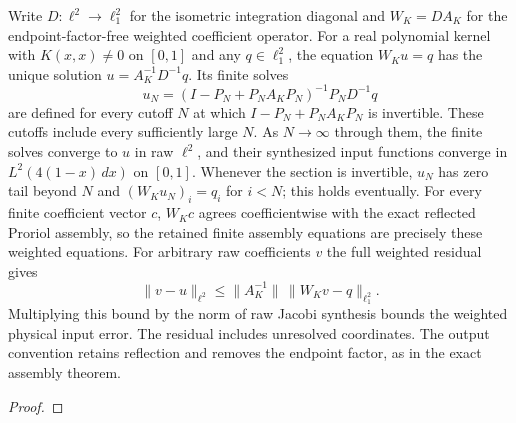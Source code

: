 \begin{theorem}
\label{thm:volterra-weighted-solves}
\leanok
Write $D:\ell^2\to\ell^2_1$ for the isometric integration diagonal and
$W_K=DA_K$ for the endpoint-factor-free weighted coefficient operator.
For a real polynomial kernel with $K(x,x)\ne0$ on $[0,1]$ and any
$q\in\ell^2_1$, the equation $W_Ku=q$ has the unique solution
$u=A_K^{-1}D^{-1}q$. Its finite solves
\[
 u_N=(I-P_N+P_NA_KP_N)^{-1}P_ND^{-1}q
\]
are defined for every cutoff $N$ at which $I-P_N+P_NA_KP_N$ is invertible. These cutoffs include every sufficiently large $N$. As $N\to\infty$ through them, the finite solves converge to $u$ in raw $\ell^2$, and their synthesized input functions converge
in $L^2(4(1-x)\,dx)$ on $[0,1]$.
Whenever the section is invertible, $u_N$ has zero tail beyond $N$ and
$(W_Ku_N)_i=q_i$ for $i<N$; this holds eventually.
For every finite coefficient vector $c$, $W_Kc$ agrees coefficientwise
with the exact reflected Proriol assembly, so the retained finite assembly
equations are precisely these weighted equations.
For arbitrary raw coefficients $v$ the full weighted residual gives
\[
 \|v-u\|_{\ell^2}\le
 \|A_K^{-1}\|\,\|W_Kv-q\|_{\ell^2_1}.
\]
Multiplying this bound by the norm of raw Jacobi synthesis bounds the
weighted physical input error. The residual includes unresolved coordinates.
The output convention retains reflection and removes the endpoint factor,
as in the exact assembly theorem.
\end{theorem}
\begin{proof}
\leanok
\end{proof}




